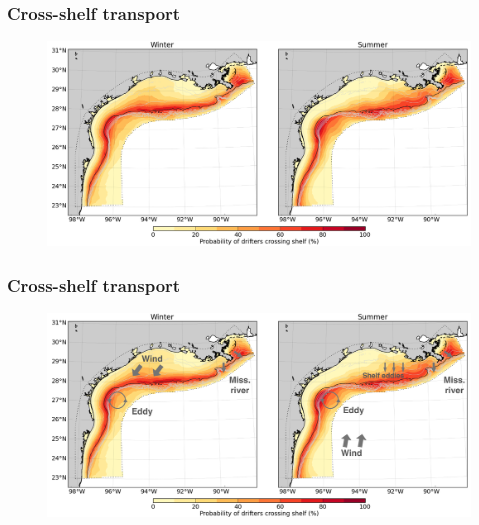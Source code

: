 \documentclass[ignorenonframetext]{beamer}
\begin{document}
\begin{frame}[t]\frametitle{Cross-shelf transport}
	\begin{figure}[htbp]
		\centering
		\includegraphics[width=\textwidth]{figures/seasonal100.png}
	\end{figure}
\end{frame}
\begin{frame}[t,noframenumbering]\frametitle{Cross-shelf transport}
	\begin{figure}[htbp]
		\centering
		\includegraphics[width=\textwidth]{figures/seasonal100_allpictures.png}
	\end{figure}
\end{frame}
\end{document}
